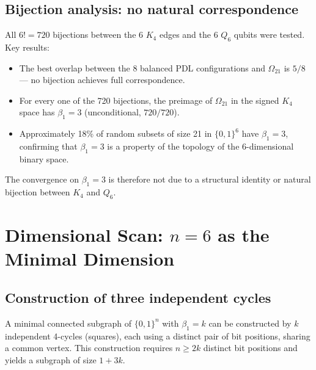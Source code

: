 \documentclass[11pt,a4paper]{article}
\begin{document}
\subsection{Bijection analysis: no natural correspondence}

All $6! = 720$ bijections between the 6 $K_4$ edges and the 6 $Q_6$ qubits were tested. Key results:
\begin{itemize}
\item The best overlap between the 8 balanced PDL configurations and $\Omega_{21}$ is $5/8$ --- no bijection achieves full correspondence.
\item For every one of the 720 bijections, the preimage of $\Omega_{21}$ in the signed $K_4$ space has $\beta_1 = 3$ (unconditional, $720/720$).
\item Approximately 18\% of random subsets of size 21 in $\{0,1\}^6$ have $\beta_1 = 3$, confirming that $\beta_1 = 3$ is a property of the topology of the 6-dimensional binary space.
\end{itemize}

The convergence on $\beta_1 = 3$ is therefore not due to a structural identity or natural bijection between $K_4$ and $Q_6$.

\section{Dimensional Scan: \texorpdfstring{$n = 6$}{n = 6} as the Minimal Dimension}
\label{sec:dimensional}

\subsection{Construction of three independent cycles}

A minimal connected subgraph of $\{0,1\}^n$ with $\beta_1 = k$ can be constructed by $k$ independent 4-cycles (squares), each using a distinct pair of bit positions, sharing a common vertex. This construction requires $n \geq 2k$ distinct bit positions and yields a subgraph of size $1 + 3k$.
\end{document}
